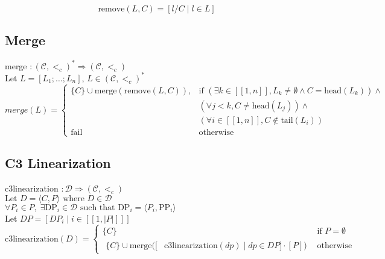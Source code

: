 \documentclass{article}
\begin{document}
\[
\text{remove}(L, C) = [l/C \mid l \in L]
\]

\vspace{2cm}
\subsection*{Merge}
merge $: (\mathcal{C},<_c)^* \Rightarrow (\mathcal{C},<_c) $ \\
Let $L = [L_1; \ldots ; L_n]$, $L \in (\mathcal{C},<_c)^*$\\


\[
merge(L) =
\begin{cases}
\{C\} \cup \text{merge}(\text{remove}(L, C)), & \text{if } (\exists k \in [\![1,n]\!], L_k \neq \emptyset \land C = \text{head}(L_k)) \land \\
& (\forall j < k, C \neq \text{head}(L_j)) \land \\ 
& (\forall i \in [\![1,n]\!],C \notin \text{tail}(L_i)) \\ 

\text{fail}  & \text{otherwise}
\end{cases}
\]

\vspace{2cm}
\subsection*{C3 Linearization}
c3linearization $: \mathcal{D} \Rightarrow (\mathcal{C},<_c)$\\
$\text{Let } D = \langle C, P \rangle \text{ where } D \in \mathcal{D}$\\
$\forall P_i \in P, \; \exists \text{DP}_i \in \mathcal{D} \text{ such that } \text{DP}_i = \langle P_i, \text{PP}_i \rangle$\\
Let $DP = [DP_i \mid i \in  [\![1, |P|]\!] ]$\\
\[
\text{c3linearization}(D) =
\begin{cases}
\{C\} & \text{if } P = \emptyset \\
\begin{split}
\{C\} \cup \text{merge}([&\text{c3linearization}(dp) \mid dp \in DP] \cdot [P]) 
\end{split} & \text{otherwise}
\end{cases}
\]
\end{document}
